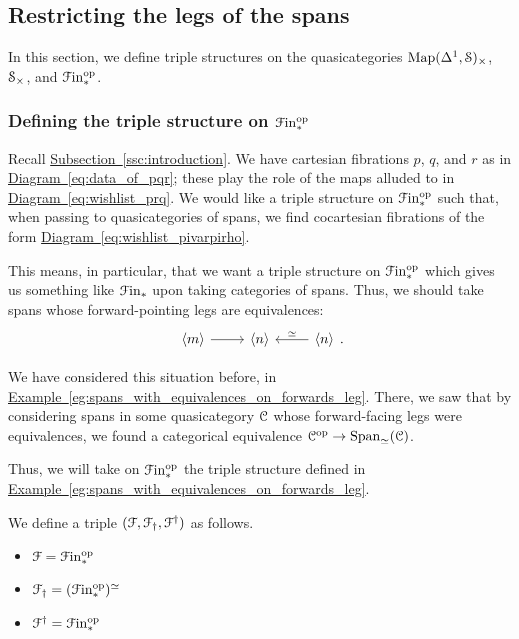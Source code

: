 \documentclass[main.tex]{subfiles}
\begin{document}
\subsection{Restricting the legs of the spans}
\label{ssc:restricting_the_legs_of_the_spans}

In this section, we define triple structures on the quasicategories $\Map(\Delta^{1}, \S)_{\times}$, $\S_{\times}$, and $\Finp\op$.

\subsubsection{Defining the triple structure on \texorpdfstring{$\Finp\op$}{Fin.op}}

Recall \hyperref[ssc:introduction]{Subsection~\ref*{ssc:introduction}}. We have cartesian fibrations $p$, $q$, and $r$ as in \hyperref[eq:data_of_pqr]{Diagram~\ref*{eq:data_of_pqr}}; these play the role of the maps alluded to in \hyperref[eq:wishlist_prq]{Diagram~\ref*{eq:wishlist_prq}}. We would like a triple structure on $\Finp\op$ such that, when passing to quasicategories of spans, we find cocartesian fibrations of the form \hyperref[eq:wishlist_pivarpirho]{Diagram~\ref*{eq:wishlist_pivarpirho}}.

This means, in particular, that we want a triple structure on $\Finp\op$ which gives us something like $\Finp$ upon taking categories of spans. Thus, we should take spans whose forward-pointing legs are equivalences:
\begin{equation*}
  \begin{tikzcd}
    \langle m \rangle
    \arrow[r]
    & \langle n \rangle
    & \langle n \rangle
    \arrow[l, swap, "\simeq"]
  \end{tikzcd}.
\end{equation*}

We have considered this situation before, in \hyperref[eg:spans_with_equivalences_on_forwards_leg]{Example~\ref*{eg:spans_with_equivalences_on_forwards_leg}}. There, we saw that by considering spans in some quasicategory $\category{C}$ whose forward-facing legs were equivalences, we found a categorical equivalence $\category{C}\op \to \Span_{\simeq}(\category{C})$.

Thus, we will take on $\Finp\op$ the triple structure defined in \hyperref[eg:spans_with_equivalences_on_forwards_leg]{Example~\ref*{eg:spans_with_equivalences_on_forwards_leg}}.

\begin{definition}
  We define a triple $\triple{F}$ as follows.
  \begin{itemize}
    \item $\mathcal{F} = \Finp\op$

    \item $\mathcal{F}\downdag = (\Finp\op)^{\simeq}$

    \item $\mathcal{F}\updag = \Finp\op$
  \end{itemize}
\end{definition}
\end{document}

